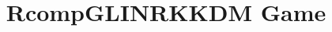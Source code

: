 \documentclass[a3paper]{article}
\title{RcompGLINRKKDM Game}
\theoremstyle{definition}
\begin{document}
\maketitle
\begin{center}

\end{center}
\begin{pchstack}

\pchspace

\pchspace
\end{pchstack}
\end{document}
